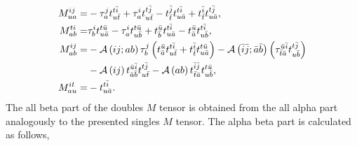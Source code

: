 \documentclass[a4paper,12pt,oneside]{book}
\newcommand{\asop}[1]{{\cal A}\left(#1\right)}
\newcommand{\ASop}[2]{{\cal A}\left(#1;#2\right)}
\newcommand{\spa}[1]{{#1}}
\newcommand{\spb}[1]{\bar{#1}}
\begin{document}
\begin{align}
M^{\spa{i}\spa{j}}_{\spa{u}\spa{a}} = &-\tau^{\spa{j}}_{\spa{a}} t^{\spa{t}\spb{i}}_{\spa{u}\spb{t}} 
                                       +\tau^{\spa{i}}_{\spa{a}} t^{\spa{t}\spb{j}}_{\spa{u}\spb{t}} 
                                       -t^{\spb{j}}_{\spb{t}} t^{\spa{t}\spb{i}}_{\spa{u}\spb{a}} 
                                       +t^{\spb{i}}_{\spb{t}} t^{\spa{t}\spb{j}}_{\spa{u}\spb{a}}, \\
M^{\spa{t}\spa{i}}_{\spa{a}\spa{b}} = &\tau^{\spa{i}}_{\spa{b}} t^{\spa{t}\spb{u}}_{\spa{u}\spb{a}} 
                                      -\tau^{\spa{i}}_{\spa{a}} t^{\spa{t}\spb{u}}_{\spa{u}\spb{b}} 
                                      +t^{\spb{u}}_{\spb{b}} t^{\spa{t}\spb{i}}_{\spa{u}\spb{a}} 
                                      -t^{\spb{u}}_{\spb{a}} t^{\spa{t}\spb{i}}_{\spa{u}\spb{b}}, \\
M^{\spa{i}\spa{j}}_{\spa{a}\spa{b}} = &-\ASop{ij}{ab} \tau^{\spa{j}}_{\spa{b}} \left( t^{\spb{u}}_{\spb{a}} t^{\spa{t}\spb{i}}_{\spa{u}\spb{t}} 
                                       +t^{\spb{i}}_{\spb{t}} t^{\spa{t}\spb{u}}_{\spa{u}\spb{a}} \right)
                                       -\ASop{\spb{i}\spb{j}}{\spb{a}\spb{b}} \left( \tau^{\spb{u}\spb{i}}_{\spb{t}\spb{a}} t^{\spa{t}\spb{j}}_{\spa{u}\spb{b}} \right) \nonumber \\
                                      &-\asop{\spa{i}\spa{j}} t^{\spb{u}\spb{i}}_{\spb{a}\spb{b}} t^{\spa{t}\spb{j}}_{\spa{u}\spb{t}} 
                                       -\asop{ab} t^{\spb{i}\spb{j}}_{\spb{t}\spb{a}} t^{\spa{t}\spb{u}}_{\spa{u}\spb{b}}, \\
M^{\spa{i}\spa{t}}_{\spa{a}\spa{u}} = &-t^{\spa{t}\spb{i}}_{\spa{u}\spb{a}}. 
\end{align}
The all beta part of the doubles $M$ tensor is obtained from the all alpha part analogously to the presented singles $M$ tensor. \newline
The alpha beta part is calculated as follows,
\end{document}
